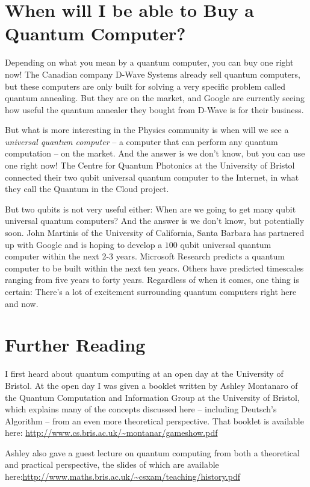 \documentclass[twocolumn]{article}
\begin{document}
\section{When will I be able to Buy a Quantum Computer?}

Depending on what you mean by a quantum computer, you can buy one right now! The Canadian company D-Wave Systems already sell quantum computers, but these computers are only built for solving a very specific problem called quantum annealing. But they are on the market, and Google are currently seeing how useful the quantum annealer they bought from D-Wave is for their business.

But what is more interesting in the Physics community is when will we see a {\em universal quantum computer} -- a computer that can perform any quantum computation -- on the market. And the answer is we don't know, but you can use one right now! The Centre for Quantum Photonics at the University of Bristol connected their two qubit universal quantum computer to the Internet, in what they call the Quantum in the Cloud project.

But two qubits is not very useful either: When are we going to get many qubit universal quantum computers? And the answer is we don't know, but potentially soon. John Martinis of the University of California, Santa Barbara has partnered up with Google and is hoping to develop a $100$ qubit universal quantum computer within the next 2-3 years. Microsoft Research predicts a quantum computer to be built within the next ten years. Others have predicted timescales ranging from five years to forty years. Regardless of when it comes, one thing is certain: There's a lot of excitement surrounding quantum computers right here and now.

\section{Further Reading}

I first heard about quantum computing at an open day at the University of Bristol. At the open day I was given a booklet written by Ashley Montanaro of the Quantum Computation and Information Group at the University of Bristol, which explains many of the concepts discussed here -- including Deutsch's Algorithm -- from an even more theoretical perspective. That booklet is available here: \url{http://www.cs.bris.ac.uk/~montanar/gameshow.pdf}

Ashley also gave a guest lecture on quantum computing from both a theoretical and practical perspective, the slides of which are available here:\url{http://www.maths.bris.ac.uk/~csxam/teaching/history.pdf}
\end{document}

